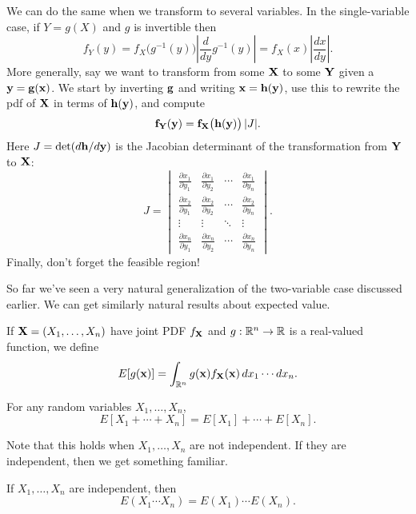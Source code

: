 \documentclass[../m157main.tex]{subfiles}
\begin{document}
We can do the same when we transform to several variables.
In the single-variable case, if $Y = g(X)$ and $g$ is invertible then
\[ f_Y(y) = f_X \big( g^{-1}(y) \big) \left| \frac{d}{dy} g^{-1}(y) \right| = f_X(x) \left| \frac{dx}{dy} \right|. \]
More generally, say we want to transform from some $\mathbf{X}$ to some $\mathbf{Y}$ given a $\mathbf{y} = \mathbf{g}(\mathbf{x})$.
We start by inverting $\mathbf{g}$ and writing $\mathbf{x} = \mathbf{h}(\mathbf{y})$, use this to rewrite the pdf of $\mathbf{X}$ in terms of $\mathbf{h}(\mathbf{y})$, and compute
\[ \mathbf{f}_{\mathbf{Y}}(\mathbf{y}) = \mathbf{f}_{\mathbf{X}} \big( \mathbf{h}(\mathbf{y}) \big) \,|J|. \]
Here $J = \det (d\mathbf{h} / d\mathbf{y})$ is the Jacobian determinant of the transformation from $\mathbf{Y}$ to $\mathbf{X}$:
\[ J = \begin{vmatrix} \frac{\partial x_1}{\partial y_1} & \frac{\partial x_1}{\partial y_2} & \cdots & \frac{\partial x_1}{\partial y_n} \\[6pt] \frac{\partial x_2}{\partial y_1} & \frac{\partial x_2}{\partial y_2} & \cdots & \frac{\partial x_2}{\partial y_n} \\ \vdots & \vdots & \ddots & \vdots \\ \frac{\partial x_n}{\partial y_1} & \frac{\partial x_n}{\partial y_2} & \cdots & \frac{\partial x_n}{\partial y_n} \end{vmatrix}. \]
Finally, don't forget the feasible region!

So far we've seen a very natural generalization of the two-variable case discussed earlier.
We can get similarly natural results about expected value.

\begin{definition}
    If $\mathbf{X} = (X_1, \ldots, X_n)$ have joint PDF $f_{\mathbf{X}}$ and $g : \mathbb{R}^n \to \mathbb{R}$ is a real-valued function, we define
    \[ E[g(\mathbf{x})] = \int_{\mathbb{R}^n} g(\mathbf{x}) f_{\mathbf{X}}(\mathbf{x}) \,dx_1 \cdots dx_n. \]
\end{definition}

\begin{theorem}
    For any random variables $X_1, \ldots, X_n$,
    \[ E[X_1 + \cdots + X_n] = E[X_1] + \cdots + E[X_n]. \]
\end{theorem}

Note that this holds when $X_1, \ldots, X_n$ are not independent.
If they are independent, then we get something familiar.

\begin{theorem}
    If $X_1, \ldots, X_n$ are independent, then
    \[ E(X_1 \cdots X_n) = E(X_1) \cdots E(X_n). \]
\end{theorem}
\end{document}
